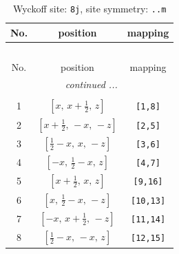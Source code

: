 \documentclass[fleqn,8pt]{jsarticle}
\begin{document}
\begin{longtable}{ccc}
\caption{Wyckoff site: {\tt 8j}, site symmetry: {\tt ..m}}
 \\
 \hline \hline
No. & position & mapping \\ \hline \endfirsthead

\multicolumn{2}{l}{\tablename\ \thetable{}} \\
 \hline \hline
No. & position & mapping \\ \hline \endhead

 \hline \hline
\multicolumn{2}{r}{\footnotesize\it continued ...} \\ \endfoot

 \hline \hline
\multicolumn{2}{r}{} \\ \endlastfoot

1 & $\left[ x,\, x + \frac{1}{2},\, z \right]$ & {\tt [1,8]} \\ \hline
2 & $\left[ x + \frac{1}{2},\, - x,\, - z \right]$ & {\tt [2,5]} \\ \hline
3 & $\left[ \frac{1}{2} - x,\, x,\, - z \right]$ & {\tt [3,6]} \\ \hline
4 & $\left[ - x,\, \frac{1}{2} - x,\, z \right]$ & {\tt [4,7]} \\ \hline
5 & $\left[ x + \frac{1}{2},\, x,\, z \right]$ & {\tt [9,16]} \\ \hline
6 & $\left[ x,\, \frac{1}{2} - x,\, - z \right]$ & {\tt [10,13]} \\ \hline
7 & $\left[ - x,\, x + \frac{1}{2},\, - z \right]$ & {\tt [11,14]} \\ \hline
8 & $\left[ \frac{1}{2} - x,\, - x,\, z \right]$ & {\tt [12,15]} \\
\end{longtable}
\renewcommand{\arraystretch}{1.2}
\end{document}
